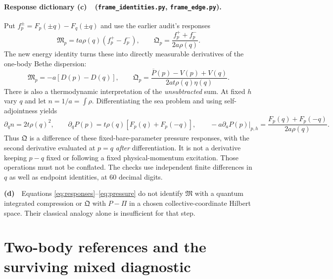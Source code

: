 \documentclass[11pt,a4paper]{article}
\newcommand{\Lc}{\textbf{(c)}\ }
\newcommand{\Ld}{\textbf{(d)}\ }
\newcommand{\id}{\texttt{frame\_\allowbreak identities.py}}
\newcommand{\ed}{\texttt{frame\_\allowbreak edge.py}}
\begin{document}
\paragraph{Response dictionary \Lc\ (\id, \ed).}
Put $f_p^\pm=F_p(\pm q)-F_q(\pm q)$ and use the earlier audit's responses
\begin{equation}
 \mathfrak M_p=ta\rho(q)(f_p^+-f_p^-),\qquad
 \mathfrak Q_p=\frac{f_p^++f_p^-}{2a\rho(q)}.
\end{equation}
The new energy identity turns these into directly measurable derivatives
of the one-body Bethe dispersion:
\begin{equation}
 \boxed{\mathfrak M_p=-a[D(p)-D(q)],\qquad
 \mathfrak Q_p=\frac{\overline P(p)-V(p)+V(q)}{2at\rho(q)\eta(q)}.}
 \label{eq:responses}
\end{equation}
There is also a thermodynamic interpretation of the \emph{unsubtracted}
sum. At fixed $h$ vary $q$ and let $n=1/a=\int\rho$. Differentiating the sea
problem and using self-adjointness yields
\begin{equation}
 \partial_q n=2t\rho(q)^2,\qquad
 \partial_qP(p)=t\rho(q)[F_p(q)+F_p(-q)],\qquad
 -a\partial_a P(p)\big|_{p,h}=\frac{F_p(q)+F_p(-q)}{2a\rho(q)}.
 \label{eq:pressure}
\end{equation}
Thus $\mathfrak Q$ is a difference of these fixed-bare-parameter pressure
responses, with the second derivative evaluated at $p=q$ \emph{after}
differentiation. It is not a derivative keeping $p-q$ fixed or following a
fixed physical-momentum excitation. Those operations must not be conflated.
The checks use independent finite differences in $q$ as well as endpoint
identities, at 60 decimal digits.

\Ld\ Equations \eqref{eq:responses}--\eqref{eq:pressure} do not identify
$\mathfrak M$ with a quantum integrated compression or $\mathfrak Q$ with
$P-\Pi$ in a chosen collective-coordinate Hilbert space. Their classical
analogy alone is insufficient for that step.

\section{Two-body references and the surviving mixed diagnostic}
\end{document}
